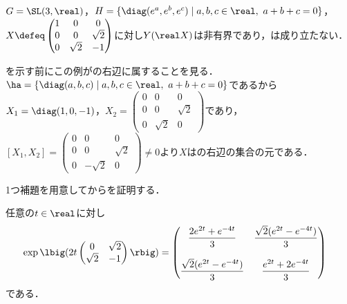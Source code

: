 \begin{prop}\label{prop:0114}
  $G = \SL(3,\real) $，$H = \{\diag(e^a,e^b,e^c)\mid a,b,c\in \real,\ a+ b + c = 0 \} $，$X\defeq
  \begin{pmatrix}
    1 & 0 & 0 \\
    0 & 0 & \sqrt{2} \\
    0 & \sqrt{2} & -1
  \end{pmatrix}
  $に対し$Y(\real X) $は非有界であり，は成り立たない．
\end{prop}

を示す前にこの例がの右辺に属することを見る．
${\ha = \{\diag(a,b,c)\mid a,b,c\in \real,\ a +b + c = 0 \} } $であるから$X_1 = \diag(1,0,-1)$，$X_2 = \begin{pmatrix}
  0 & 0 & 0 \\
  0 & 0 & \sqrt{2} \\
  0 & \sqrt{2} & 0
\end{pmatrix}$であり，$[X_1, X_2] = \begin{pmatrix}
  0 & 0 & 0 \\
  0 & 0 & \sqrt{2} \\
  0 & -\sqrt{2} & 0
\end{pmatrix} \neq 0$より$X$はの右辺の集合の元である．%

1つ補題を用意してからを証明する．
\begin{lem}\label{lem:0114}
  任意の$t\in \real$に対し
  \begin{align*}
    \exp\lbig(2t\begin{pmatrix}
      0 & \sqrt{2} \\
      \sqrt{2} & -1 
    \end{pmatrix}\rbig) &=
                 \begin{pmatrix}
                   \dfrac{2e^{2t} + e^{-4t}}{3} &  \dfrac{\sqrt{2} (e^{2t} - e^{-4t})}{3}\\
                   \\
                   \dfrac{\sqrt{2} (e^{2t} - e^{-4t})}{3} & \dfrac{e^{2t} + 2e^{-4t}}{3}
                 \end{pmatrix}
  \end{align*}
  である．
\end{lem}

